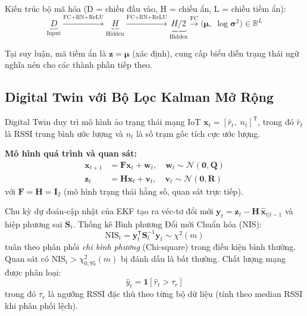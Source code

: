 \documentclass[12pt, a4paper]{article}
\begin{document}
Kiến trúc bộ mã hóa (D = chiều đầu vào, H = chiều ẩn, L = chiều tiềm ẩn):
\begin{equation}
  \underbrace{D}_{\text{Input}}
  \xrightarrow{\text{FC+BN+ReLU}}
  \underbrace{H}_{\text{Hidden}}
  \xrightarrow{\text{FC+BN+ReLU}}
  \underbrace{H/2}_{\text{Hidden}}
  \xrightarrow{\text{FC}}
  \bigl(\boldsymbol{\mu},\;\log\boldsymbol{\sigma}^2\bigr)
  \in \mathbb{R}^{L}
  \label{eq:encoder_arch}
\end{equation}

Tại suy luận, mã tiềm ẩn là $\mathbf{z} = \boldsymbol{\mu}$
(xác định), cung cấp biểu diễn trạng thái ngữ nghĩa nén cho
các thành phần tiếp theo.

\subsection{Digital Twin với Bộ Lọc Kalman Mở Rộng}
\label{subsec:dt}

Digital Twin duy trì mô hình ảo trạng thái mạng IoT
$\mathbf{x}_t = [\hat{r}_t,\; n_t]^{\mathsf{T}}$,
trong đó $\hat{r}_t$ là RSSI trung bình ước lượng và
$n_t$ là số trạm gốc tích cực ước lượng.

\textbf{Mô hình quá trình và quan sát:}
\begin{align}
  \mathbf{x}_{t+1} &= \mathbf{F}\mathbf{x}_t + \mathbf{w}_t,
  \quad \mathbf{w}_t \sim \mathcal{N}(\mathbf{0}, \mathbf{Q})
  \label{eq:ekf_process} \\
  \mathbf{z}_t     &= \mathbf{H}\mathbf{x}_t + \mathbf{v}_t,
  \quad \mathbf{v}_t \sim \mathcal{N}(\mathbf{0}, \mathbf{R})
  \label{eq:ekf_obs}
\end{align}
với $\mathbf{F} = \mathbf{H} = \mathbf{I}_2$ (mô hình trạng thái
hằng số, quan sát trực tiếp).

Chu kỳ dự đoán-cập nhật của EKF tạo ra véc-tơ đổi mới
$\mathbf{y}_t = \mathbf{z}_t - \mathbf{H}\,\hat{\mathbf{x}}_{t|t-1}$
và hiệp phương sai $\mathbf{S}_t$.
Thống kê Bình phương Đổi mới Chuẩn hóa (NIS):
\begin{equation}
  \text{NIS}_t = \mathbf{y}_t^{\mathsf{T}} \mathbf{S}_t^{-1} \mathbf{y}_t
  \sim \chi^2(m)
  \label{eq:nis}
\end{equation}
tuân theo phân phối \textit{chi bình phương} (Chi-square) trong
điều kiện bình thường. Quan sát có
$\text{NIS}_t > \chi^2_{0{,}95}(m)$ bị đánh dấu là bất thường.
Chất lượng mạng được phân loại:
\begin{equation}
  \hat{y}_t = \mathbf{1}[\hat{r}_t > \tau_r]
  \label{eq:quality}
\end{equation}
trong đó $\tau_r$ là ngưỡng RSSI đặc thù theo từng bộ dữ liệu
(tính theo median RSSI khi phân phối lệch).
\end{document}
